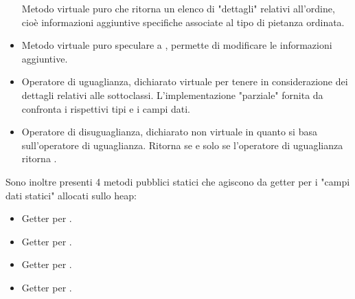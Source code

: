\begin{itemize}
	Metodo virtuale puro che ritorna un elenco di "dettagli" relativi all'ordine, cioè informazioni aggiuntive specifiche associate al tipo di pietanza ordinata.
	\item {}\newline
	Metodo virtuale puro speculare a , permette di modificare le informazioni aggiuntive.
	\item {}\newline
	Operatore di uguaglianza, dichiarato virtuale per tenere in considerazione dei dettagli relativi alle sottoclassi. L'implementazione "parziale" fornita da  confronta i rispettivi tipi e i campi dati.
	\item {}\newline
	Operatore di disuguaglianza, dichiarato non virtuale in quanto si basa sull'operatore di uguaglianza. Ritorna  se e solo se l'operatore di uguaglianza ritorna .
\end{itemize}
Sono inoltre presenti 4 metodi pubblici statici che agiscono da getter per i "campi dati statici" allocati sullo heap:
\begin{itemize}
	\item {}\newline
	Getter per .
	\item {}\newline
	Getter per .
	\item {}\newline
	Getter per .
	\item {}\newline
	\newline
	Getter per .
\end{itemize}
